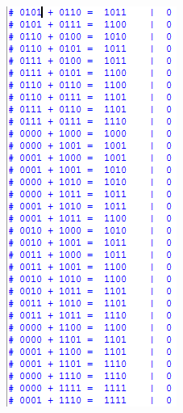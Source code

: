 \begin{figure}[H]
		\begin{subfigure}[b]{0.44\textwidth}
			\includegraphics[width=\textwidth]{img/etapa3/simulacaoSomadorCompleto4Bits_3}

\end{subfigure}
\end{figure}
